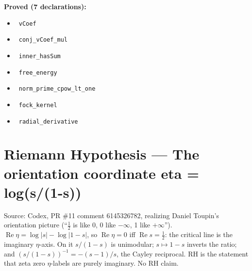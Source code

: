 \documentclass{report}
\theoremstyle{definition}
\begin{document}
\noindent\textbf{Proved (7 declarations):}
\begin{itemize}
  \item {}\leanok\ \texttt{vCoef}
  \item {}\leanok\ \texttt{conj\_vCoef\_mul}
  \item {}\leanok\ \texttt{inner\_hasSum}
  \item {}\leanok\ \texttt{free\_energy}
  \item {}\leanok\ \texttt{norm\_prime\_cpow\_lt\_one}
  \item {}\leanok\ \texttt{fock\_kernel}
  \item {}\leanok\ \texttt{radial\_derivative}
\end{itemize}

\section{Riemann Hypothesis --- The orientation coordinate eta = log(s/(1-s))}
Source: Codex, PR \#11 comment 6145326782, realizing Daniel Toupin's orientation picture (``$\tfrac12$ is like 0, 0 like $-\infty$, 1 like $+\infty$''). $\operatorname{Re}\eta=\log|s|-\log|1-s|$, so $\operatorname{Re}\eta=0$ iff $\operatorname{Re}s=\tfrac12$: the critical line is the imaginary $\eta$-axis. On it $s/(1-s)$ is unimodular; $s\mapsto1-s$ inverts the ratio; and $(s/(1-s))^{-1}=-(s-1)/s$, the Cayley reciprocal. RH is the statement that zeta zero $\eta$-labels are purely imaginary. No RH claim.
\end{document}

